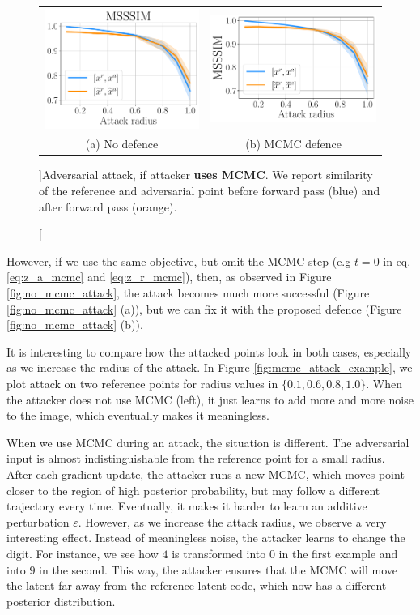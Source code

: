 \begin{figure}[h]
	\centering
	\begin{tabular}{cc}
		\includegraphics[width=0.4\columnwidth]{pics/3_adv_att/attack_mcmc_1_0.pdf} & 
		\includegraphics[width=0.44\columnwidth]{pics/3_adv_att/attack_mcmc_1_100.pdf} \\
		\small{(a) No defence} & \small{(b) MCMC defence} \\
	\end{tabular}
	\caption[][\baselineskip]{Adversarial attack, if attacker \textbf{uses MCMC}. We report similarity of the reference and adversarial point before forward pass (blue) and after forward pass (orange). }
	\label{fig:mcmc_attack}
	\vspace*{2\baselineskip}
\end{figure}

However, if we use the same objective, but omit the MCMC step (e.g $t=0$ in eq. \ref{eq:z_a_mcmc} and \ref{eq:z_r_mcmc}), then, as observed in Figure \ref{fig:no_mcmc_attack}, the attack becomes much more successful (Figure \ref{fig:no_mcmc_attack} (a)), but we can fix it with the proposed defence (Figure \ref{fig:no_mcmc_attack} (b)).

It is interesting to compare how the attacked points look in both cases, especially as we increase the radius of the attack. In Figure \ref{fig:mcmc_attack_example}, we plot attack on two reference points for radius values in $\{0.1, 0.6, 0.8, 1.0\}$. When the attacker does not use MCMC (left), it just learns to add more and more noise to the image, which eventually makes it meaningless. 
 
 When we use MCMC during an attack, the situation is different. The adversarial input is almost indistinguishable from the reference point for a small radius. After each gradient update, the attacker runs a new MCMC, which moves point closer to the region of high posterior probability, but may follow a different trajectory every time. Eventually, it makes it harder to learn an additive perturbation $\varepsilon$. However, as we increase the attack radius, we observe a very interesting effect. Instead of meaningless noise, the attacker learns to change the digit. For instance, we see how $4$ is transformed into $0$ in the first example and into $9$ in the second. This way, the attacker ensures that the MCMC will move the latent far away from the reference latent code, which now has a different posterior distribution.


